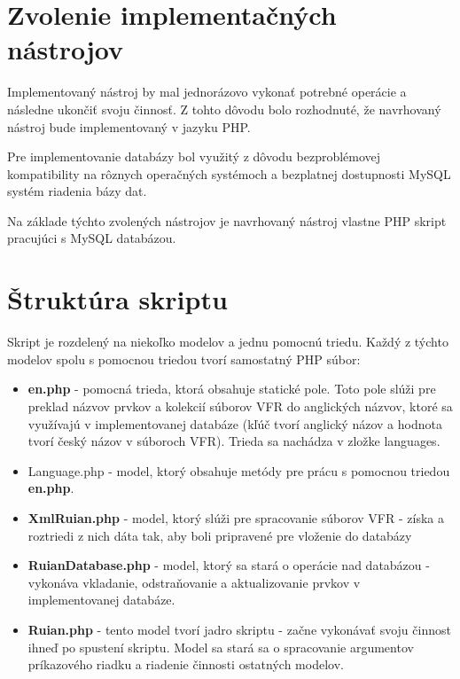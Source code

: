 \section{Zvolenie implementačných nástrojov}
Implementovaný nástroj by mal jednorázovo vykonať potrebné operácie a následne ukončiť svoju činnosť. Z tohto dôvodu bolo rozhodnuté, že navrhovaný nástroj bude implementovaný v jazyku PHP.

Pre implementovanie databázy bol využitý z dôvodu bezproblémovej kompatibility na rôznych operačných systémoch a bezplatnej dostupnosti MySQL systém riadenia bázy dat.

Na základe týchto zvolených nástrojov je navrhovaný nástroj vlastne PHP skript pracujúci s MySQL databázou.
\section{Štruktúra skriptu}
Skript je rozdelený na niekoľko modelov a jednu pomocnú triedu. Každý z týchto modelov spolu s pomocnou triedou tvorí samostatný PHP súbor:
\begin{itemize}
    \item {\bf en.php} - pomocná trieda, ktorá obsahuje statické pole. Toto pole slúži pre preklad názvov prvkov a kolekcií súborov VFR do anglických názvov, ktoré sa využívajú v implementovanej databáze (kľúč tvorí anglický názov a hodnota tvorí český názov v súboroch VFR). Trieda sa nachádza v zložke languages.
    \item{Language.php} - model, ktorý obsahuje metódy pre prácu s pomocnou triedou {\bf en.php}.
    \item{{\bf XmlRuian.php} - model, ktorý slúži pre spracovanie súborov VFR - získa a roztriedi z nich dáta tak, aby boli pripravené pre vloženie do databázy}
    \item{{\bf RuianDatabase.php} - model, ktorý sa stará o operácie nad databázou - vykonáva vkladanie, odstraňovanie a aktualizovanie prvkov v implementovanej databáze.}
    \item{{\bf Ruian.php} - tento model tvorí jadro skriptu - začne vykonávať svoju činnost ihneď po spustení skriptu. Model sa stará sa o spracovanie argumentov príkazového riadku a riadenie činnosti ostatných modelov.}
\end{itemize}
